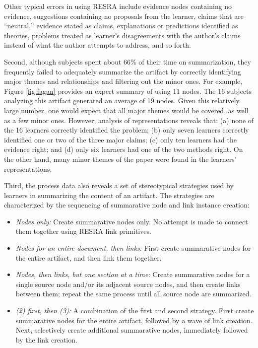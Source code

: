 Other typical errors in using RESRA include evidence nodes
containing no evidence, suggestions containing no proposals from the
learner, claims that are ``neutral,'' evidence stated as claims,
explanations or predictions identified as theories, problems treated as
learner's disagreements with the author's claims instead of what the author
attempts to address, and so forth. 

Second, although subjects spent about 66\% of their time on summarization,
they frequently failed to adequately summarize the artifact by correctly
identifying major themes and relationships and filtering out the minor
ones.  For example, Figure \ref{fig:fagan} provides an expert summary of
\cite{Fagan76} using 11 nodes. The 16 subjects analyzing this artifact
generated an average of 19 nodes. Given this relatively large number, one
would expect that all major themes would be covered, as well as a few minor
ones.  However, analysis of representations reveals that: (a) none of the
16 learners correctly identified the problem; (b) only seven learners
correctly identified one or two of the three major claims; (c) only ten
learners had the evidence right; and (d) only six learners had one of the
two methods right. On the other hand, many minor themes of the paper were
found in the learners' representations.

Third, the process data also reveals a set of stereotypical strategies used
by learners in summarizing the content of an artifact. The strategies are
characterized by the sequencing of summarative node and link instance
creation:

\begin{itemize}
\item {\it Nodes only:} Create summarative nodes only. No attempt is made
  to connect them together using RESRA link primitives.
  
\item {\it Nodes for an entire document, then links:} First create
  summarative nodes for the entire artifact, and then link them together.
  
\item {\it Nodes, then links, but one section at a time:} Create
  summarative nodes for a single source node and/or its adjacent source
  nodes, and then create links between them; repeat the same process until
  all source node are summarized.
  
\item {\sl (2) first, then (3):} A combination of the first and second
  strategy. First create summarative nodes for the entire artifact,
  followed by a wave of link creation. Next, selectively create additional
  summarative nodes, immediately followed by the link creation.
\end{itemize}

